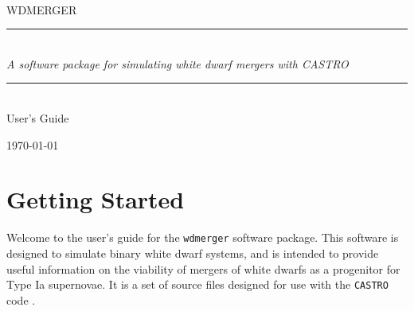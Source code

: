 \documentclass[12pt]{book}
\newcommand{\HRule}{\rule{\linewidth}{0.125mm}}
\begin{document}
\newcommand\actaa{Acta Astron.}%
\newcommand\caa{Chinese Astron. Astrophys.}%
\newcommand\cjaa{Chinese J. Astron. Astrophys.}%
\newcommand\jcap{J. Cosmology Astropart. Phys.}%
\newcommand\na{New A}%
\newcommand\nar{New A Rev.}%
\newcommand\pasa{PASA}%
\newcommand\rmxaa{Rev. Mexicana Astron. Astrofis.}%


\frontmatter

\begin{titlepage}
\begin{center}
\ \\[3in]
{\sf \Huge WDMERGER} 

\begin{minipage}{5.5in}
\HRule\\[2mm]
\centering
{\Large \em A software package for simulating white dwarf mergers with CASTRO}

\HRule
\end{minipage}

\ \\[1 in]
{\sf \huge User's Guide}

\vfill

{\large \today}
\end{center}

\end{titlepage}



\tableofcontents

\mainmatter

\chapter{Getting Started}

Welcome to the user's guide for the \texttt{wdmerger} software package. This software is designed to
simulate binary white dwarf systems, and is intended to provide useful information on the 
viability of mergers of white dwarfs as a progenitor for Type Ia supernovae. It is a set of 
source files designed for use with the \texttt{CASTRO} code \citep{castro}.
\end{document}
